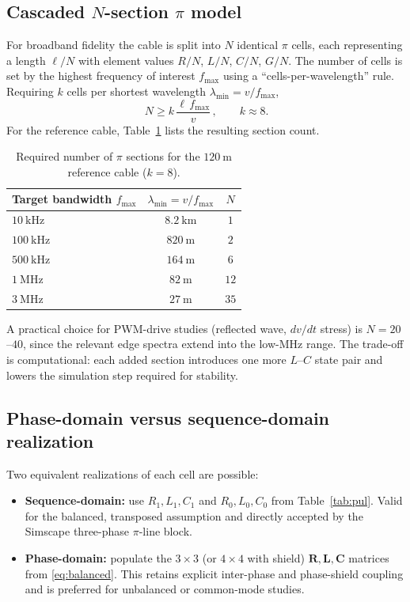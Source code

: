 \documentclass[11pt,a4paper]{article}
\newcommand{\Rmat}{\bm{R}}
\newcommand{\Lmat}{\bm{L}}
\newcommand{\Cmat}{\bm{C}}
\begin{document}
\subsection{Cascaded $N$-section $\pi$ model}
For broadband fidelity the cable is split into $N$ identical $\pi$ cells, each
representing a length $\ell/N$ with element values $R/N$, $L/N$, $C/N$, $G/N$. The
number of cells is set by the highest frequency of interest $f_{\max}$ using a
``cells-per-wavelength'' rule. Requiring $k$ cells per shortest wavelength
$\lambda_{\min}=v/f_{\max}$,
\begin{equation}
\boxed{\,N \ge k\,\frac{\ell\,f_{\max}}{v}\,},\qquad k\approx 8 .
\label{eq:Ncriterion}
\end{equation}
For the reference cable, Table~\ref{tab:N} lists the resulting section count.

\begin{table}[h]
\centering
\caption{Required number of $\pi$ sections for the $120\ \mathrm{m}$ reference cable
($k=8$).}
\label{tab:N}
\begin{tabular}{@{}lcc@{}}
\toprule
Target bandwidth $f_{\max}$ & $\lambda_{\min}=v/f_{\max}$ & $N$ \\
\midrule
$10\ \mathrm{kHz}$  & $8.2\ \mathrm{km}$  & $1$ \\
$100\ \mathrm{kHz}$ & $820\ \mathrm{m}$   & $2$ \\
$500\ \mathrm{kHz}$ & $164\ \mathrm{m}$   & $6$ \\
$1\ \mathrm{MHz}$   & $82\ \mathrm{m}$    & $12$ \\
$3\ \mathrm{MHz}$   & $27\ \mathrm{m}$    & $35$ \\
\bottomrule
\end{tabular}
\end{table}

\noindent
A practical choice for PWM-drive studies (reflected wave, $dv/dt$ stress) is
$N=20$--$40$, since the relevant edge spectra extend into the low-MHz range. The
trade-off is computational: each added section introduces one more $L$--$C$ state
pair and lowers the simulation step required for stability.

\subsection{Phase-domain versus sequence-domain realization}
Two equivalent realizations of each cell are possible:
\begin{itemize}[leftmargin=*]
\item \textbf{Sequence-domain:} use $R_1,L_1,C_1$ and $R_0,L_0,C_0$ from
Table~\ref{tab:pul}. Valid for the balanced, transposed assumption and directly
accepted by the Simscape three-phase $\pi$-line block.
\item \textbf{Phase-domain:} populate the $3\times3$ (or $4\times4$ with shield)
$\Rmat,\Lmat,\Cmat$ matrices from \eqref{eq:balanced}. This retains explicit
inter-phase and phase-shield coupling and is preferred for unbalanced or
common-mode studies.
\end{itemize}
\end{document}
